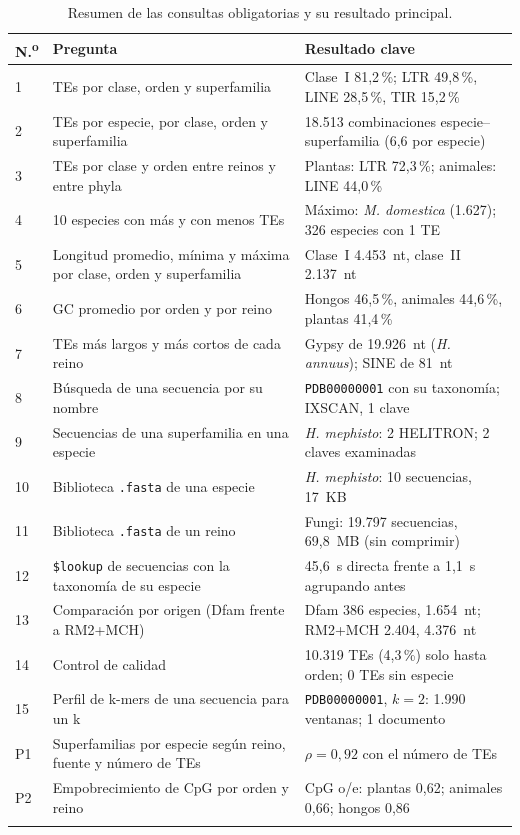 \documentclass[unnumsec,namedate,webpdf,contemporary,large]{oup-authoring-template}
\begin{document}
\begin{table}[!t]
\caption{Resumen de las consultas obligatorias y su resultado principal.\label{tab:consultas}}
\footnotesize
\begin{tabular}{@{}p{}p{}p{}@{}}
\toprule
N.\textsuperscript{o} & Pregunta & Resultado clave \\
\midrule
1 & TEs por clase, orden y superfamilia & Clase~I 81,2\,\%; LTR 49,8\,\%, LINE 28,5\,\%, TIR 15,2\,\% \\
2 & TEs por especie, por clase, orden y superfamilia & 18.513 combinaciones especie--superfamilia (6,6 por especie) \\
3 & TEs por clase y orden entre reinos y entre phyla & Plantas: LTR 72,3\,\%; animales: LINE 44,0\,\% \\
4 & 10 especies con m\'as y con menos TEs & M\'aximo: \textit{M. domestica} (1.627); 326 especies con 1 TE \\
5 & Longitud promedio, m\'inima y m\'axima por clase, orden y superfamilia & Clase~I 4.453~nt, clase~II 2.137~nt \\
6 & GC promedio por orden y por reino & Hongos 46,5\,\%, animales 44,6\,\%, plantas 41,4\,\% \\
7 & TEs m\'as largos y m\'as cortos de cada reino & Gypsy de 19.926~nt (\textit{H. annuus}); SINE de 81~nt \\
8 & B\'usqueda de una secuencia por su nombre & \texttt{PDB00000001} con su taxonom\'ia; IXSCAN, 1 clave \\
9 & Secuencias de una superfamilia en una especie & \textit{H. mephisto}: 2 HELITRON; 2 claves examinadas \\
10 & Biblioteca \texttt{.fasta} de una especie & \textit{H. mephisto}: 10 secuencias, 17~KB \\
11 & Biblioteca \texttt{.fasta} de un reino & Fungi: 19.797 secuencias, 69,8~MB (sin comprimir) \\
12 & \texttt{\$lookup} de secuencias con la taxonom\'ia de su especie & 45,6~s directa frente a 1,1~s agrupando antes \\
13 & Comparaci\'on por origen (Dfam frente a RM2+MCH) & Dfam 386 especies, 1.654~nt; RM2+MCH 2.404, 4.376~nt \\
14 & Control de calidad & 10.319 TEs (4,3\,\%) solo hasta orden; 0 TEs sin especie \\
15 & Perfil de k-mers de una secuencia para un k & \texttt{PDB00000001}, $k = 2$: 1.990 ventanas; 1 documento \\
P1 & Superfamilias por especie seg\'un reino, fuente y n\'umero de TEs & $\rho = 0{,}92$ con el n\'umero de TEs \\
P2 & Empobrecimiento de CpG por orden y reino & CpG o/e: plantas 0,62; animales 0,66; hongos 0,86 \\
\botrule
\end{tabular}
\end{table}
\end{document}
